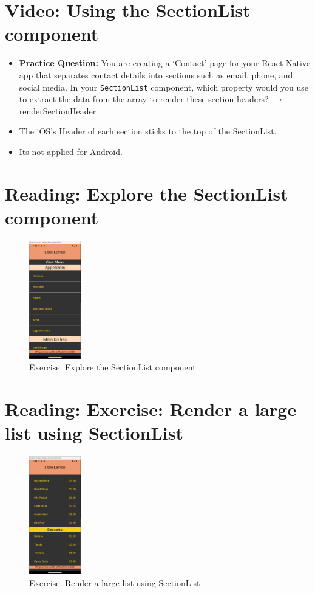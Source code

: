 \section{Video: Using the SectionList component}
\begin{itemize}
    \item \textbf{Practice Question:} You are creating a ‘Contact’ page for your React Native app that separates contact details into sections such as email, phone, and social media. In your \texttt{SectionList} component, which property would you use to extract the data from the array to render these section headers?  
    $\rightarrow$ renderSectionHeader 

    \item The iOS's Header of each section sticks to the top of the SectionList.
    \item Its not applied for Android.
\end{itemize}

\section{Reading: Explore the SectionList component}
\begin{figure}[H]
    \centering
    \includegraphics[width=0.2\textwidth]{images/ex2.png}
    \caption{Exercise: Explore the SectionList component}
\end{figure}

\section{Reading: Exercise: Render a large list using SectionList}
\begin{figure}[H]
    \centering
    \includegraphics[width=0.2\textwidth]{images/Ex3.png}
    \caption{Exercise: Render a large list using SectionList}
\end{figure}

